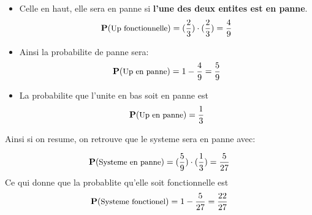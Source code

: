 \documentclass[a4paper]{tufte-handout}
\begin{document}
\begin{enumerate}
      \begin{itemize}
        \item Celle en haut, elle sera en panne si \textbf{l'une des deux
          entites est en panne}.
          \begin{equation*}
            \P(\text{\small Up fonctionnelle})  = (\frac{2}{3})\cdot (\frac{2}{3}) = \frac{4}{9}
          \end{equation*}
        \item Ainsi la probabilite de panne sera:
          \begin{equation*}
            \P(\text{\small Up en panne})  = 1 - \frac{4}{9} = \frac{5}{9}
          \end{equation*}
        \item La probabilite que l'unite en bas soit en panne est 
          \begin{equation}
            \P(\text{\small Up en panne}) = \frac{1}{3}
          \end{equation}
      \end{itemize}
      Ainsi si on resume, on retrouve que le systeme sera en panne avec:

      \begin{equation*}
        \P(\text{\small{Systeme en panne}}) = (\frac{5}{9})\cdot(\frac{1}{3}) =
        \frac{5}{27}
      \end{equation*}
      Ce qui donne que la probablite qu'elle soit fonctionnelle est 
      \begin{equation*}
        \P(\text{\small{Systeme fonctionel}}) = 1 - \frac{5}{27} = \frac{22}{27}
      \end{equation*}
\end{enumerate}
\end{document}
